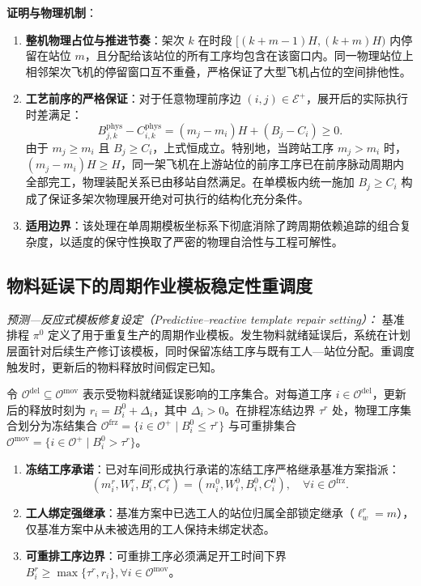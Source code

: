 \documentclass[journal,10pt]{IEEEtran}
\begin{document}
\textbf{证明与物理机制}：
\begin{enumerate}
\item \textbf{整机物理占位与推进节奏}：架次 $k$ 在时段 $[(k+m-1)H,(k+m)H)$ 内停留在站位 $m$，且分配给该站位的所有工序均包含在该窗口内。同一物理站位上相邻架次飞机的停留窗口互不重叠，严格保证了大型飞机占位的空间排他性。
\item \textbf{工艺前序的严格保证}：对于任意物理前序边 $(i,j)\in\mathcal{E}^{+}$，展开后的实际执行时差满足：
\begin{equation}
B_{j,k}^{\mathrm{phys}} - C_{i,k}^{\mathrm{phys}} = (m_j - m_i)H + (B_j - C_i) \ge 0.
\end{equation}
由于 $m_j \ge m_i$ 且 $B_j \ge C_i$，上式恒成立。特别地，当跨站工序 $m_j > m_i$ 时，$(m_j - m_i)H \ge H$，同一架飞机在上游站位的前序工序已在前序脉动周期内全部完工，物理装配关系已由移站自然满足。在单模板内统一施加 $B_j \ge C_i$ 构成了保证多架次物理展开绝对可执行的结构化充分条件。
\item \textbf{适用边界}：该处理在单周期模板坐标系下彻底消除了跨周期依赖追踪的组合复杂度，以适度的保守性换取了严密的物理自洽性与工程可解性。
\end{enumerate}

\subsection{物料延误下的周期作业模板稳定性重调度}\label{sec:rescheduling}

\textit{预测---反应式模板修复设定（Predictive--reactive template repair setting）：}
基准排程 $\pi^0$ 定义了用于重复生产的周期作业模板。发生物料就绪延误后，系统在计划层面针对后续生产修订该模板，同时保留冻结工序与既有工人---站位分配。重调度触发时，更新后的物料释放时间假定已知。

令 $\mathcal{O}^{\mathrm{del}}\subseteq\mathcal{O}^{\mathrm{mov}}$ 表示受物料就绪延误影响的工序集合。对每道工序 $i\in\mathcal{O}^{\mathrm{del}}$，更新后的释放时刻为 $r_i=B_i^0+\Delta_i$，其中 $\Delta_i>0$。在排程冻结边界 $\tau^r$ 处，物理工序集合划分为冻结集合 $\mathcal{O}^{\mathrm{frz}}=\{i\in\mathcal{O}^{+}\mid B_i^0\le\tau^r\}$ 与可重排集合 $\mathcal{O}^{\mathrm{mov}}=\{i\in\mathcal{O}^{+}\mid B_i^0>\tau^r\}$。

\begin{enumerate}
\item \textbf{冻结工序承诺}：已对车间形成执行承诺的冻结工序严格继承基准方案指派：
\begin{equation}
(m_i^r, W_i^r, B_i^r, C_i^r) = (m_i^0, W_i^0, B_i^0, C_i^0), \quad \forall i\in\mathcal{O}^{\mathrm{frz}}.
\end{equation}
\item \textbf{工人绑定强继承}：基准方案中已选工人的站位归属全部锁定继承（$\ell_w^r=m$），仅基准方案中从未被选用的工人保持未绑定状态。
\item \textbf{可重排工序边界}：可重排工序必须满足开工时间下界 $B_i^r \ge \max\{\tau^r, r_i\}, \forall i\in\mathcal{O}^{\mathrm{mov}}$。
\end{enumerate}
\end{document}
